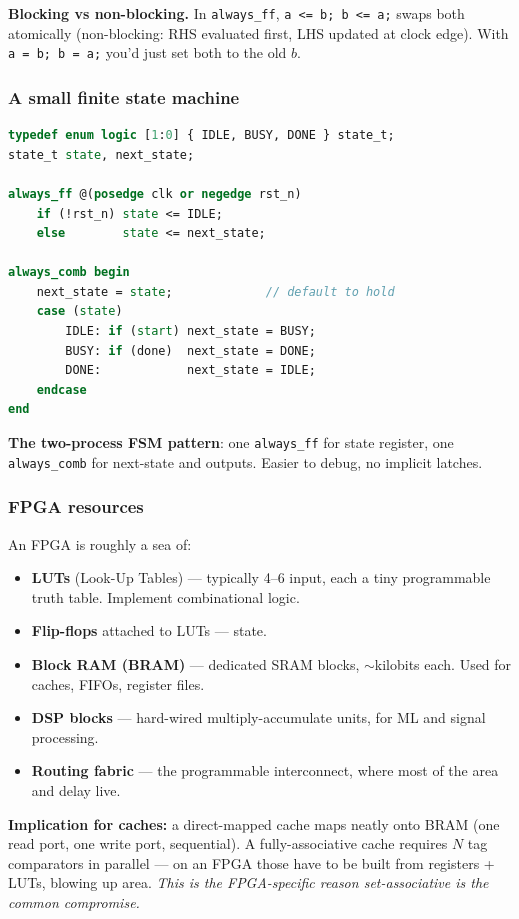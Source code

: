 \documentclass[11pt,a4paper]{article}
\begin{document}
\textbf{Blocking vs non-blocking.} In \verb|always_ff|, \verb|a <= b; b <= a;| swaps both atomically (non-blocking: RHS evaluated first, LHS updated at clock edge). With \verb|a = b; b = a;| you'd just set both to the old $b$.

\subsubsection*{A small finite state machine}

\begin{lstlisting}[language=sv]
typedef enum logic [1:0] { IDLE, BUSY, DONE } state_t;
state_t state, next_state;

always_ff @(posedge clk or negedge rst_n)
    if (!rst_n) state <= IDLE;
    else        state <= next_state;

always_comb begin
    next_state = state;             // default to hold
    case (state)
        IDLE: if (start) next_state = BUSY;
        BUSY: if (done)  next_state = DONE;
        DONE:            next_state = IDLE;
    endcase
end
\end{lstlisting}

\textbf{The two-process FSM pattern}: one \verb|always_ff| for state register, one \verb|always_comb| for next-state and outputs. Easier to debug, no implicit latches.

\subsubsection*{FPGA resources}

An FPGA is roughly a sea of:
\begin{itemize}[leftmargin=*,itemsep=1pt]
  \item \textbf{LUTs} (Look-Up Tables) --- typically 4--6 input, each a tiny programmable truth table. Implement combinational logic.
  \item \textbf{Flip-flops} attached to LUTs --- state.
  \item \textbf{Block RAM (BRAM)} --- dedicated SRAM blocks, $\sim$kilobits each. Used for caches, FIFOs, register files.
  \item \textbf{DSP blocks} --- hard-wired multiply-accumulate units, for ML and signal processing.
  \item \textbf{Routing fabric} --- the programmable interconnect, where most of the area and delay live.
\end{itemize}

\textbf{Implication for caches:} a direct-mapped cache maps neatly onto BRAM (one read port, one write port, sequential). A fully-associative cache requires $N$ tag comparators in parallel --- on an FPGA those have to be built from registers + LUTs, blowing up area. \emph{This is the FPGA-specific reason set-associative is the common compromise.}
\end{document}
